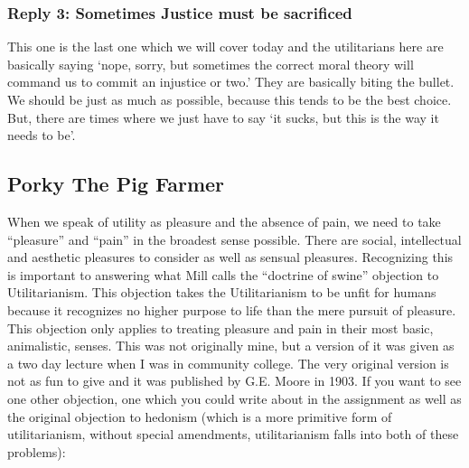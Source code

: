 \subsubsection{Reply 3: Sometimes Justice must be sacrificed}

This one is the last one which we will cover today and the utilitarians here are basically saying ‘nope, sorry, but sometimes the correct moral theory will command us to commit an injustice or two.’ They are basically biting the bullet. We should be just as much as possible, because this tends to be the best choice. But, there are times where we just have to say ‘it sucks, but this is the way it needs to be’.

\subsection{Porky The Pig Farmer}

When we speak of utility as pleasure and the absence of pain, we need to take “pleasure” and “pain” in the broadest sense possible. There are social, intellectual and aesthetic pleasures to consider as well as sensual pleasures. Recognizing this is important to answering what Mill calls the “doctrine of swine” objection to Utilitarianism. This objection takes the Utilitarianism to be unfit for humans because it recognizes no higher purpose to life than the mere pursuit of pleasure. This objection only applies to treating pleasure and pain in their most basic, animalistic, senses.  This was not originally mine, but a version of it was given as a two day lecture when I was in community college. The very original version is not as fun to give and it was published by G.E. Moore in 1903. If you want to see one other objection, one which you could write about in the assignment as well as the original objection to hedonism (which is a more primitive form of utilitarianism, without special amendments, utilitarianism falls into both of these problems):

